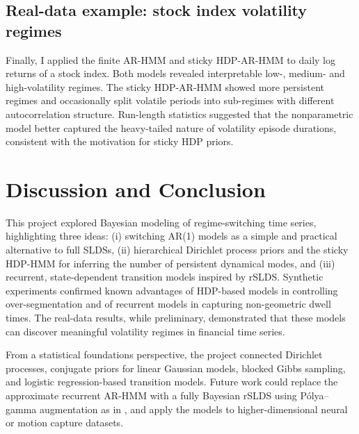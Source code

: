 \documentclass[11pt]{article}
\begin{document}
\subsection{Real-data example: stock index volatility regimes}

Finally, I applied the finite AR-HMM and sticky HDP-AR-HMM to daily log
returns of a stock index. Both models revealed interpretable
low-, medium- and high-volatility regimes. The sticky HDP-AR-HMM
showed more persistent regimes and occasionally split volatile periods
into sub-regimes with different autocorrelation structure. Run-length
statistics suggested that the nonparametric model better captured the
heavy-tailed nature of volatility episode durations, consistent with
the motivation for sticky HDP priors.

\section{Discussion and Conclusion}

This project explored Bayesian modeling of regime-switching time series,
highlighting three ideas: (i) switching AR(1) models as a simple and
practical alternative to full SLDSs, (ii) hierarchical Dirichlet
process priors and the sticky HDP-HMM for inferring the number of
persistent dynamical modes, and (iii) recurrent, state-dependent
transition models inspired by rSLDS. Synthetic experiments confirmed
known advantages of HDP-based models in controlling over-segmentation
and of recurrent models in capturing non-geometric dwell times. The
real-data results, while preliminary, demonstrated that these models
can discover meaningful volatility regimes in financial time series.

From a statistical foundations perspective, the project connected
Dirichlet processes, conjugate priors for linear Gaussian models,
blocked Gibbs sampling, and logistic regression-based transition
models. Future work could replace the approximate recurrent AR-HMM
with a fully Bayesian rSLDS using P{\'o}lya--gamma augmentation as in
\citet{linderman2017}, and apply the models to higher-dimensional
neural or motion capture datasets.
\end{document}
